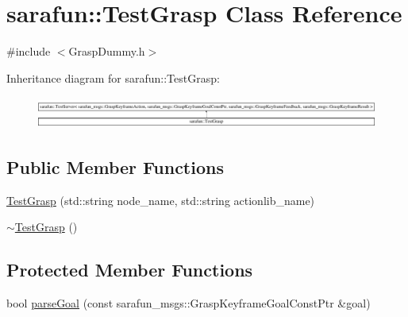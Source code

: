 \hypertarget{classsarafun_1_1TestGrasp}{\section{sarafun\-:\-:Test\-Grasp Class Reference}
\label{classsarafun_1_1TestGrasp}
}


{\ttfamily \#include $<$Grasp\-Dummy.\-h$>$}

Inheritance diagram for sarafun\-:\-:Test\-Grasp\-:\begin{figure}[H]
\begin{center}
\leavevmode
\includegraphics[height=1.046729cm]{classsarafun_1_1TestGrasp}
\end{center}
\end{figure}
\subsection*{Public Member Functions}
\begin{DoxyCompactItemize}
\item 
\hyperlink{classsarafun_1_1TestGrasp_a271a9845d2436b578a67b5be0b1ff3f3}{Test\-Grasp} (std\-::string node\-\_\-name, std\-::string actionlib\-\_\-name)
\item 
\hyperlink{classsarafun_1_1TestGrasp_ac49b5dffffedba55736264d9c321df22}{$\sim$\-Test\-Grasp} ()
\end{DoxyCompactItemize}
\subsection*{Protected Member Functions}
\begin{DoxyCompactItemize}
\item 
bool \hyperlink{classsarafun_1_1TestGrasp_a2fe802b91970efe925cf6dc620bf7378}{parse\-Goal} (const sarafun\-\_\-msgs\-::\-Grasp\-Keyframe\-Goal\-Const\-Ptr \&goal)
\end{DoxyCompactItemize}


